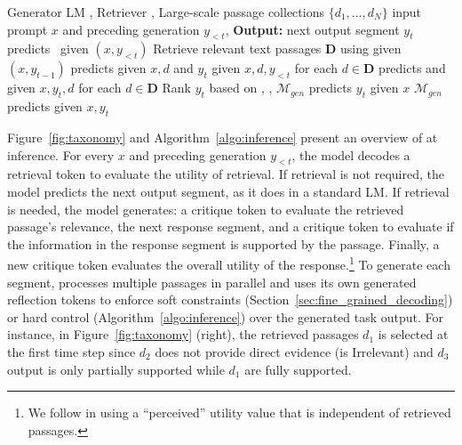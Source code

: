 \begin{algorithm}
\caption{\model Inference}\label{alg:self_reward inference}
\begin{algorithmic}[1]
\Require Generator LM \mgen, Retriever \mret, Large-scale passage collections $\{d_1, \ldots, d_N\}$ 
 input prompt $x$ and preceding generation $y_{<t}$, {\bf Output:} next output segment $y_t$
\State \mgen predicts \ret~given $(x,y_{<t})$
    \State Retrieve relevant text passages $\mathbf{D}$  using \mret given $(x,y_{t-1})$ \Comment{\textcolor{blue}{Retrieve} }
    \State \mgen predicts \crel given $x, d$ and $y_{t}$ given $x,d, y_{<t}$ for each $d \in \mathbf{D}$ \Comment{\textcolor{blue}{Generate} }
    \State \mgen predicts \cgr and \cuse given $x, y_t, d$ for each $d \in \mathbf{D}$ \Comment{\textcolor{blue}{Critique} }
    \State Rank $y_t$ based on \crel, \cgr, \cuse {}
    \State $\mathcal{M}_{gen}$ predicts $y_t$ given $x$ \Comment{\textcolor{blue}{Generate} }
    \State $\mathcal{M}_{gen}$ predicts \cuse given $x,y_t$\Comment{\textcolor{blue}{Critique} }
\EndIf
\end{algorithmic}\label{algo:inference}
\end{algorithm}

Figure~\ref{fig:taxonomy} and Algorithm~\ref{algo:inference} present an overview of \model at inference. 
For every $x$ and preceding generation $y_{<t}$, the model decodes a retrieval token to evaluate the utility of retrieval. If retrieval is not required, the model predicts the next output segment, as it does in a standard LM.   
If retrieval is needed, the model generates: a critique token to evaluate the retrieved passage's relevance, the next response segment, and a critique token to evaluate if the information in the response segment is supported by the passage. Finally, a  new critique token evaluates the overall utility of the response.\footnote{We follow \citet{liu2023evaluating} in using a ``perceived'' utility value that is independent of retrieved passages.} 
To generate each segment, \model processes multiple passages in parallel and uses its own generated reflection tokens to enforce soft constraints (Section~\ref{sec:fine_grained_decoding}) or hard control (Algorithm~\ref{algo:inference}) over the generated task output. 
For instance, in Figure~\ref{fig:taxonomy} (right), the retrieved passages $d_1$ is selected at the first time step since $d_2$ does not provide direct evidence (\crel is {Irrelevant}) and $d_3$ output is only partially supported while $d_1$ are fully supported. 

